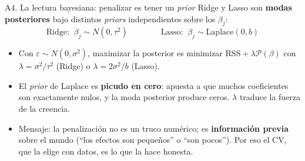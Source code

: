 \documentclass{beamer}
\newcommand{\1}{\mathbb{I}}
\newcommand{\RSS}{\mathrm{RSS}}
\begin{document}
\begin{frame}{A4. La lectura bayesiana: penalizar es tener un \emph{prior}}
\small
Ridge y Lasso son \textbf{modas posteriores} bajo distintos \emph{priors} independientes sobre los $\beta_j$:
\[ \text{Ridge:} \;\; \beta_j \sim N(0, \tau^2) \qquad\qquad \text{Lasso:} \;\; \beta_j \sim \mathrm{Laplace}(0, b) \]
\begin{center}
\end{center}
\pause
\begin{itemize}\itemsep3pt
  \item Con $\varepsilon \sim N(0, \sigma^2)$, maximizar la posterior es minimizar $\RSS + \lambda \mathcal{P}(\beta)$ con $\lambda = \sigma^2/\tau^2$ (Ridge) o $\lambda = 2\sigma^2/b$ (Lasso).
  \item El \emph{prior} de Laplace es \textbf{picudo en cero}: apuesta a que muchos coeficientes son exactamente nulos, y la moda posterior produce ceros. $\lambda$ traduce la fuerza de la creencia.
  \item Mensaje: la penalización no es un truco numérico; es \textbf{información previa} sobre el mundo (``los efectos son pequeños'' o ``son pocos''). Por eso el CV, que la elige con datos, es lo que la hace honesta.
\end{itemize}
\end{frame}
\end{document}

